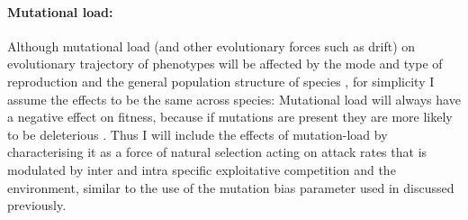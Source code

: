 \documentclass[a4paper]{report}
\begin{document}
\paragraph{Mutational load:} Although mutational load (and other evolutionary forces such as drift) on evolutionary trajectory of phenotypes will be affected by the mode and type of reproduction and the general population structure of species \citep{frean2013}, for simplicity I assume the effects to be the same across species: Mutational load will always have a negative effect on fitness, because if mutations are present they are more likely to be deleterious \citep{Eyre-walker2007}. Thus I will include the effects of mutation-load by characterising it as a force of natural selection acting on attack rates that is modulated by inter and intra specific exploitative competition and the environment, similar to the use of the mutation bias parameter used in \citep{Rossberg2008} discussed previously. \\

\newpage
\end{document}

